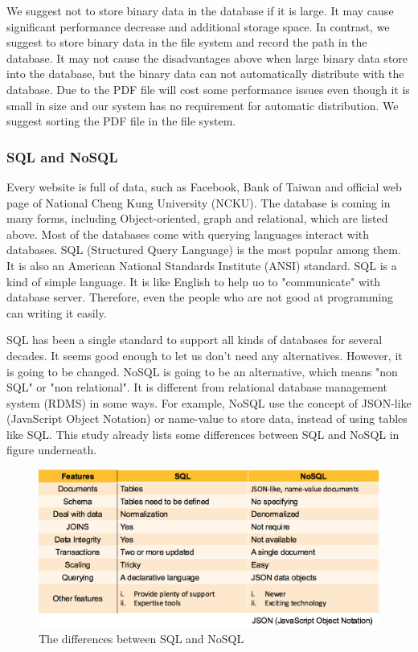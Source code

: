\begin{enumerate}
    We suggest not to store binary data in the database if it is large.
    It may cause significant performance decrease and additional storage space.
    In contrast, we suggest to store binary data in the file system and record the path in the database. 
    It may not cause the disadvantages above when large binary data store into the database, but the binary data can not automatically distribute with the database.
    Due to the PDF file will cost some performance issues even though it is small in size and our system has no requirement for automatic distribution.
    We suggest sorting the PDF file in the file system.
	
\end{enumerate}


\subsubsection{SQL and NoSQL}
Every website is full of data, such as Facebook, Bank of Taiwan and official web page of National Cheng Kung University (NCKU).
The database is coming in many forms, including Object-oriented, graph and relational, which are listed above.
Most of the databases come with querying languages interact with databases.
SQL (Structured Query Language) is the most popular among them. 
It is also an American National Standards Institute (ANSI) standard.
SQL is a kind of simple language.
It is like English to help uo to "communicate" with database server.
Therefore, even the people who are not good at programming can writing it easily.

SQL has been a single standard to support all kinds of databases for several decades.
It seems good enough to let us don't need any alternatives.
However, it is going to be changed.
NoSQL is going to be an alternative, which means "non SQL" or "non relational". 
It is different from relational database management system (RDMS) in some ways.
For example, NoSQL use the concept of JSON-like (JavaScript Object Notation) or name-value to store data, instead of using tables like SQL. This study already lists some differences between SQL and NoSQL in figure underneath.

\begin{figure}[tbh]
	\begin{center}
		\includegraphics[width=\columnwidth]{Wolverine_Method_Chart_3}
	\end{center}
	\caption{The differences between SQL and NoSQL}
\end{figure}

